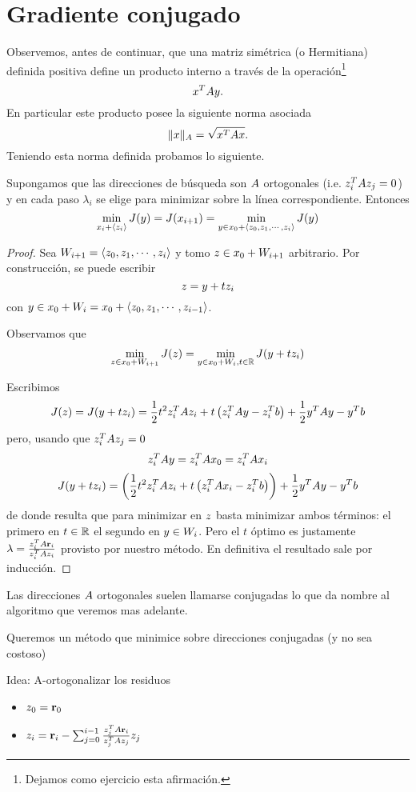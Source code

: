 \section{Gradiente conjugado}
Observemos, antes de continuar, que una matriz simétrica (o Hermitiana) definida positiva define un producto interno a través de la operación\footnote{Dejamos como ejercicio esta afirmación.}
$$
\xb^T\Ab\yb.
$$
En particular este producto posee la siguiente norma asociada
$$
\|\xb\|_A=\sqrt{\xb^T\Ab\xb}.
$$
Teniendo esta norma definida probamos lo siguiente.
\tcc
\begin{lema}
Supongamos que las direcciones de búsqueda son $\Ab$ ortogonales (i.e. $\zb_i^T\Ab\zb_j=0$) y en cada paso $\lambda_i$ se elige para minimizar sobre la línea correspondiente. Entonces
$$
\min_{\xb_i+\langle \zb_i\rangle}J(\yb)=J(\xb_{i+1})=\min_{\yb\in \xb_0+\langle \zb_0,\zb_1,\cdots,\zb_i \rangle} J(\yb)
$$
\end{lema}
\etcc
\begin{proof}
 Sea $W_{i+1}=\langle \zb_0,\zb_1,\cdots,\zb_i \rangle$ y tomo $\zb\in \xb_0+W_{i+1}$ arbitrario. Por construcción, se puede escribir
 $$\zb=\yb+t\zb_i$$ con $\yb\in \xb_0+ W_i=\xb_0+\langle \zb_0,\zb_1,\cdots,\zb_{i-1} \rangle$.

Observamos que
  $$
 \min_{\zb\in \xb_0+W_{i+1}}J(\zb)=\min_{\yb\in\xb_0+W_{i},t \in \R} J(\yb+t \zb_i)
 $$

Escribimos
$$
J(z)=J(\yb+t\zb_i)=\frac{1}{2}t^2\zb_i^T\Ab\zb_i+t\left(\zb_i^T\Ab\yb-\zb_i^T\bb\right) +\frac{1}{2}\yb^T\Ab\yb-\yb^T\bb
$$
pero, usando que $\zb_i^T\Ab\zb_j=0$
$$
\zb_i^T\Ab\yb=\zb_i^T\Ab\xb_0=\zb_i^T\Ab\xb_i
$$
$$
J(\yb+t\zb_i)=\left(\frac{1}{2}t^2\zb_i^T\Ab\zb_i+t\left(\zb_i^T\Ab\xb_i-\zb_i^T\bb\right)\right) +\frac{1}{2}\yb^T\Ab\yb-\yb^T\bb
$$
de donde resulta que
para minimizar en $\zb$ basta minimizar ambos términos: el primero en $t\in \mathbb R$ el segundo en $\yb\in W_i$. Pero el $t$ óptimo es justamente $\lambda=\frac{\zb_i^T\Ab\rb_i}{\zb_i^T\Ab\zb_i}$ provisto por nuestro método. En definitiva
  el resultado sale por inducción.
\end{proof}

\tccdefi
\begin{center}Las direcciones $\Ab$ ortogonales suelen llamarse conjugadas lo que da nombre al algoritmo que veremos mas adelante.
\end{center}
\etcc
Queremos un método que minimice sobre direcciones conjugadas (y no sea costoso)

Idea: A-ortogonalizar los residuos
\begin{itemize}
 \item $\zb_0=\rb_0$
 \item $\zb_i=\rb_i-\sum_{j=0}^{i-1}\frac{\zb_j^T\Ab\rb_i}{\zb_j^T\Ab\zb_j}\zb_j$
\end{itemize}



